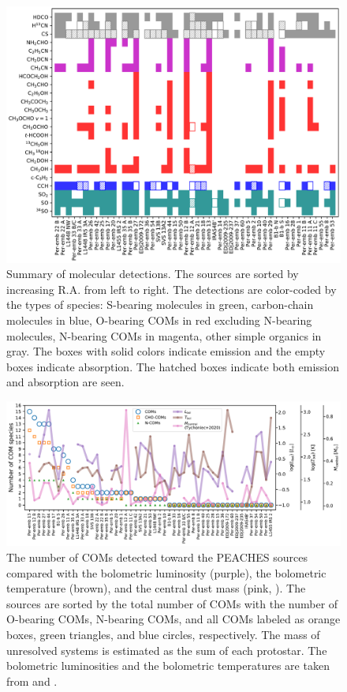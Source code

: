 \documentclass[twocolumn]{aastex62}
\begin{document}
\begin{figure}[htbp!]
  \includegraphics[width=\textwidth]{stats.pdf}
  \caption{Summary of molecular detections.  The sources are sorted by increasing R.A. from left to right.  The detections are color-coded by the types of species: S-bearing molecules in green, carbon-chain molecules in blue, O-bearing COMs in red excluding N-bearing molecules, N-bearing COMs in magenta, other simple organics in gray.  The boxes with solid colors indicate emission and the empty boxes indicate absorption.  The hatched boxes indicate both emission and absorption are seen.}
  \label{fig:stats}
\end{figure}

\begin{figure}[htbp!]
  \centering
  \includegraphics[width=\textwidth]{detection_summary_all.pdf}
  \caption{The number of COMs detected toward the PEACHES sources compared with the bolometric luminosity (purple), the bolometric temperature (brown), and the central dust mass (pink, \citet{2020arXiv200602812T}).  The sources are sorted by the total number of COMs with the number of O-bearing COMs, N-bearing COMs, and all COMs labeled as orange boxes, green triangles, and blue circles, respectively.  The mass of unresolved systems is estimated as the sum of each protostar.  The bolometric luminosities and the bolometric temperatures are taken from \citet{2016ApJ...818...73T} and \citet{2016A&A...592A..56M}.}
  \label{fig:detection_summary}
\end{figure}
\end{document}
